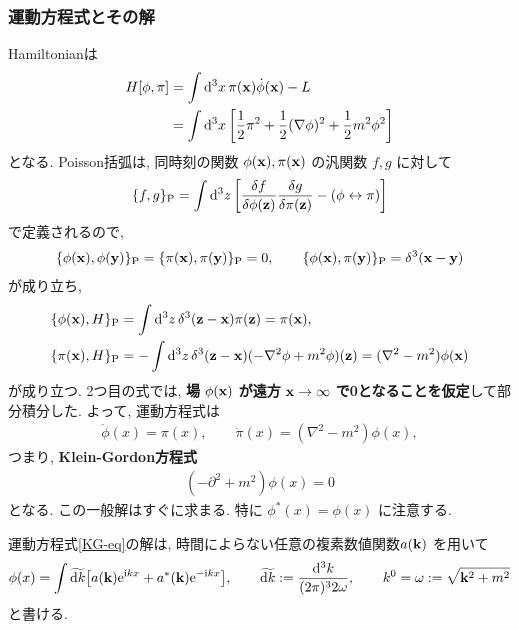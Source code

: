 \documentclass[../note01.tex]{subfiles}
\begin{document}
\subsubsection{運動方程式とその解}
Hamiltonianは
\begin{align}
    H[\phi,\pi] &= \int\dd[3]{x} \pi(\vb{x})\dot{\phi}(\vb{x}) -L \notag \\
    &= \int\dd[3]{x} \qty[\frac{1}{2}\pi^2 + \frac{1}{2}(\nabla\phi)^2 + \frac{1}{2}m^2\phi^2]
\end{align}
となる. Poisson括弧は, 同時刻の関数 $ \phi(\vb{x}),\pi(\vb{x}) $ の汎関数 $ f,g $ に対して
\begin{align}
    \{f,g\}_\mathrm{P} = \int\dd[3]{z} \qty[\fdv{f}{\phi(\vb{z})}\fdv{g}{\pi(\vb{z})} - (\phi\leftrightarrow\pi)]
\end{align}
で定義されるので,
\begin{align}\label{Poisson_bracket}
    \{\phi(\vb{x}),\phi(\vb{y})\}_\mathrm{P} = \{\pi(\vb{x}),\pi(\vb{y})\}_\mathrm{P} = 0, \qquad
    \{\phi(\vb{x}),\pi(\vb{y})\}_\mathrm{P} = \delta^3(\vb{x}-\vb{y})
\end{align}
が成り立ち,
\begin{align*}
    \{\phi(\vb{x}),H\}_\mathrm{P} &= \int\dd[3]{z} \delta^3(\vb{z}-\vb{x})\pi(\vb{z}) = \pi(\vb{x}), \\
    \{\pi(\vb{x}),H\}_\mathrm{P} &= -\int\dd[3]{z} \delta^3(\vb{z}-\vb{x})(-\nabla^2\phi + m^2\phi)(\vb{z}) = (\nabla^2-m^2)\phi(\vb{x})
\end{align*}
が成り立つ. 2つ目の式では, \textbf{場} $ \phi(\vb{x}) $ \textbf{が遠方} $ \vb{x}\to\infty $ \textbf{で0となることを仮定}して部分積分した.
よって, 運動方程式は
\begin{align}
    \dot{\phi}(x)=\pi(x), \qquad \dot{\pi}(x)=(\nabla^2-m^2)\phi(x),
\end{align}
つまり, \textbf{Klein-Gordon方程式}
\begin{align}\label{KG-eq}
    (-\partial^2+m^2)\phi(x)=0
\end{align}
となる. この一般解はすぐに求まる. 特に $ \phi^*(x)=\phi(x) $ に注意する.
\begin{katei}
    運動方程式\eqref{KG-eq}の解は, 時間によらない任意の複素数値関数$ a(\vb{k}) $ を用いて
    \begin{align}
        \phi(x) = \int\widetilde{\dd{k}} \qty[a(\vb{k})\mathrm{e}^{\mathrm{i} kx} + a^*(\vb{k})\mathrm{e}^{-\mathrm{i} kx}], \qquad
        \widetilde{\dd{k}} := \frac{\dd[3]{k}}{(2\pi)^3 2\omega}, \qquad
        k^0 = \omega := \sqrt{\vb{k}^2+m^2}
    \end{align}
    と書ける.
\end{katei}
\end{document}
